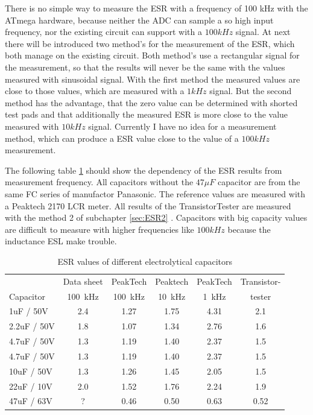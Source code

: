 There is no simple way to measure the ESR with a frequency of 100 kHz with the ATmega hardware,
because neither the ADC can sample a so high input frequency, nor the existing circuit can support
with a \(100kHz\) signal.
At next there will be introduced two method's for the measurement of the ESR, which both manage on 
the existing circuit.
Both method's use a rectangular signal for the measurement, so that the results will never be
the same with the values measured with sinusoidal signal.
With the first method the measured values are close to those values, which are measured with a
\(1kHz\) signal. 
But the second method has the advantage, that the zero value can be determined with shorted test pads and
that additionally the measured ESR is more close to the value measured with \(10kHz\) signal.
Currently I have no idea for a measurement method, which can produce a ESR value close to the
value of a \(100kHz\) measurement.

The following table \ref{tab:capESR} should show the dependency of the ESR results from measurement frequency.
All capacitors without the \(47\mu F\) capacitor are from the same FC series of manufactor Panasonic.
The reference values are measured with a Peaktech 2170 LCR meter.
All results of the TransistorTester are measured with the method 2 of subchapter \ref{sec:ESR2} .
Capacitors with big capacity values are difficult to measure with higher frequencies like \(100kHz\) because
the inductance ESL make trouble.

\begin{table}[H]
  \begin{center}
    \begin{tabular}{| l | c | c | c | c | c |}
   \hline
            & Data sheet & PeakTech  & Peaktech & PeakTech & Transistor- \\
Capacitor   & 100~kHz    & 100~kHz   & 10~kHz   & 1~kHz    & tester  \\
    \hline
    \hline
1uF / 50V    & 2.4       & 1.27      & 1.75     & 4.31     &  2.1 \\
    \hline
2.2uF / 50V  & 1.8       & 1.07      & 1.34     & 2.76     &  1.6 \\
    \hline
4.7uF / 50V  & 1.3       & 1.19      & 1.40     & 2.37     &  1.5 \\
    \hline
4.7uF / 50V  & 1.3       & 1.19      & 1.40     & 2.37     &  1.5 \\
    \hline
10uF / 50V   & 1.3       & 1.26      & 1.45     & 2.05     &  1.5 \\
    \hline
22uF / 10V   & 2.0       & 1.52      & 1.76     & 2.24     &  1.9 \\
    \hline
47uF / 63V   & ?         & 0.46      & 0.50     & 0.63     &  0.52 \\
    \hline
    \end{tabular}
  \end{center}
  \caption{ESR values of different electrolytical capacitors}
  \label{tab:capESR} 
\end{table}



